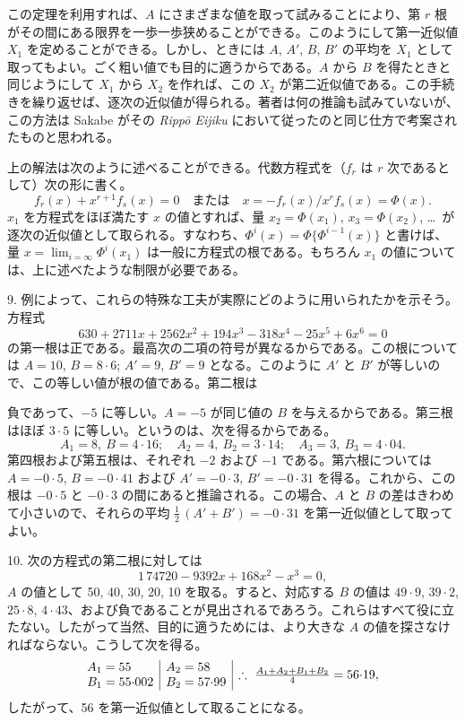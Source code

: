 \documentclass[11pt]{article}
\newcommand{\scanpage}[2]{\clearpage\setcounter{footnote}{0}\noindent{\footnotesize\color{gray}PDF #1 頁 · #2}\par\medskip}
\begin{document}
この定理を利用すれば、$A$ にさまざまな値を取って試みることにより、第 $r$ 根がその間にある限界を一歩一歩狭めることができる。このようにして第一近似値 $X_1$ を定めることができる。しかし、ときには $A$, $A'$, $B$, $B'$ の平均を $X_1$ として取ってもよい。ごく粗い値でも目的に適うからである。$A$ から $B$ を得たときと同じようにして $X_1$ から $X_2$ を作れば、この $X_2$ が第二近似値である。この手続きを繰り返せば、逐次の近似値が得られる。著者は何の推論も試みていないが、この方法は Sakabe がその \emph{Rippō Eijiku} において従ったのと同じ仕方で考案されたものと思われる。

上の解法は次のように述べることができる。代数方程式を（$f_r$ は $r$ 次であるとして）次の形に書く。
\[ f_r(x) + x^{r+1} f_s(x) = 0 \quad\text{または}\quad x = -f_r(x)/x^r f_s(x) = \Phi(x). \]
$x_1$ を方程式をほぼ満たす $x$ の値とすれば、量 $x_2 = \Phi(x_1)$, $x_3 = \Phi(x_2)$, \dots\ が逐次の近似値として取られる。すなわち、$\Phi^i(x) = \Phi\{\Phi^{i-1}(x)\}$ と書けば、量 $x = \lim_{i=\infty} \Phi^i(x_1)$ は一般に方程式の根である。もちろん $x_1$ の値については、上に述べたような制限が必要である。

9. 例によって、これらの特殊な工夫が実際にどのように用いられたかを示そう。方程式
\[ 630 + 2711x + 2562x^2 + 194x^3 - 318x^4 - 25x^5 + 6x^6 = 0 \]
の第一根は正である。最高次の二項の符号が異なるからである。この根については $A = 10$, $B = 8{\cdot}6$; $A' = 9$, $B' = 9$ となる。このように $A'$ と $B'$ が等しいので、この等しい値が根の値である。第二根は

\scanpage{0279}{印刷頁 265}
\noindent 負であって、$-5$ に等しい。$A = -5$ が同じ値の $B$ を与えるからである。第三根はほぼ $3{\cdot}5$ に等しい。というのは、次を得るからである。
\[
A_1 = 8,\ B = 4{\cdot}16;\quad A_2 = 4,\ B_2 = 3{\cdot}14;\quad A_3 = 3,\ B_3 = 4{\cdot}04.
\]
第四根および第五根は、それぞれ $-2$ および $-1$ である。第六根については $A = -0{\cdot}5$, $B = -0{\cdot}41$ および $A' = -0{\cdot}3$, $B' = -0{\cdot}31$ を得る。これから、この根は $-0{\cdot}5$ と $-0{\cdot}3$ の間にあると推論される。この場合、$A$ と $B$ の差はきわめて小さいので、それらの平均 $\frac{1}{2}\,(A' + B') = -0{\cdot}31$ を第一近似値として取ってよい。

10. 次の方程式の第二根に対しては
\[
1\,74720 - 9392x + 168x^2 - x^3 = 0,
\]
$A$ の値として 50, 40, 30, 20, 10 を取る。すると、対応する $B$ の値は $49{\cdot}9$, $39{\cdot}2$, $25{\cdot}8$, $4{\cdot}43$、および負であることが見出されるであろう。これらはすべて役に立たない。したがって当然、目的に適うためには、より大きな $A$ の値を探さなければならない。こうして次を得る。
\[
\begin{array}{l|l|l}
\begin{array}{@{}l@{}} A_1 = 55\\ B_1 = 55{\cdot}002 \end{array} &
\begin{array}{@{}l@{}} A_2 = 58\\ B_2 = 57{\cdot}99 \end{array} &
\therefore\ \frac{A_1 + A_2 + B_1 + B_2}{4} = 56{\cdot}19,
\end{array}
\]
したがって、56 を第一近似値として取ることになる。
\end{document}
